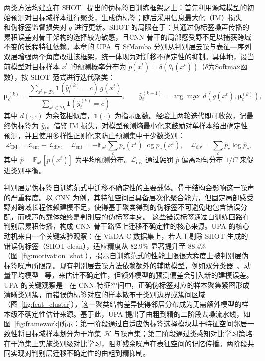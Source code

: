 两类方法均建立在 SHOT~\cite{liang2021source} 提出的伪标签自训练框架之上：首先利用源域模型的初始预测对目标域样本进行聚类，生成伪标签；随后采用信息最大化（IM）损失~\cite{gomes2010discriminative} 和伪标签监督损失对 $g$ 进行更新。SHOT 的局限在于：其通过伪标签噪声传播的累积误差对骨干架构的选择较为敏感，且CNN 骨干的局部感受野不足以捕获跨域不变的长程特征依赖。本章的 UPA 与 SfMamba 分别从判别层去噪与表征—序列双层增强两个角度改进该框架，统一体现为对迁移不确定性的抑制。具体地，设当前模型对目标样本 $x^t$ 的预测概率分布为 $p(x^t) = \delta(\theta_t(x^t))$（$\delta$为Softmax函数），按 SHOT 范式进行迭代聚类：
\begin{equation}
\boldsymbol{\mu}^{(k)}_c = \frac{\sum_{x^t \in \mathcal{D}_t} \mathbf{1}(\hat{y}^{(k)}_t = c) \, g(x^t)}{\sum_{x^t \in \mathcal{D}_t} \mathbf{1}(\hat{y}^{(k)}_t = c)}, \qquad
\hat{y}^{(k+1)}_t = \arg\max_c \, d\!\left(g(x^t), \boldsymbol{\mu}^{(k)}_c\right),
\label{eq:chap2_proto}
\end{equation}
其中 $d(\cdot, \cdot)$ 为余弦相似度，$\mathbf{1}(\cdot)$ 为指示函数。经验上两轮迭代即可收敛，记最终伪标签为 $\hat{y}_t$。借鉴 IM 损失，对模型预测熵最小化来鼓励对单样本给出确定性预测，并且使用多样性正则化来防止预测集中于少数类别：
\begin{equation}
\mathcal{L}_{\text{IM}} = \mathcal{L}_{\text{ent}} + \mathcal{L}_{\text{div}}, \quad
\mathcal{L}_{\text{ent}} = -\mathbb{E}_{x^t} \sum_c p_c(x^t) \log p_c(x^t), \quad
\mathcal{L}_{\text{div}} = \sum_c \hat{p}_c \log \hat{p}_c,
\label{eq:chap2_im}
\end{equation}
其中 $\hat{p} = \mathbb{E}_{x^t}[p(x^t)]$ 为平均预测分布。$\mathcal{L}_{\text{div}}$ 通过惩罚 $\hat{p}$ 偏离均匀分布 $1/C$ 来促进类别平衡。

判别层是伪标签自训练范式中迁移不确定性的主要载体。骨干结构会影响这一噪声的严重程度。以 CNN 为例，其特征空间虽具备层次化聚合能力，但固定局部感受野对跨域长程依赖建模不足，使得基于聚类得到的伪标签不可避免地包含错误分配，而噪声的载体始终是判别层的伪标签本身。
这些错误标签通过自训练回路在判别层累积传播，构成 CNN 骨干路径上迁移不确定性的核心来源。UPA 的核心动机来自一个关键实验观察：在 VisDA-C 数据集上，若人工剔除 SHOT 生成的错误伪标签（SHOT-clean），适应精度从 82.9\% 显著提升至 88.4\%（图~\ref{fig:motivation_shot}），揭示自训练范式的性能上限很大程度上被判别层伪标签噪声所限制。现有判别层去噪方法依赖额外的辅助模型，例如双分类器~\cite{liang2021source}、动量平均模型~\cite{tarvainen2017mean} 等，来估计不确定性，但额外模型的预测偏差会引入新的建模误差。UPA 的关键观察是：在 CNN 特征空间中，正确伪标签对应的样本聚集紧密形成清晰类别簇，而错误伪标签对应的样本散布于类别边界或簇间区域（图~\ref{fig:feat_cluster}），这一聚类结构差异使得邻居分布成为无需额外模型的样本级不确定性估计来源。基于此，UPA 提出了由粗到精的二阶段去噪流水线，如图~\ref{fig:framework}所示：第一阶段通过自适应伪标签选择模块基于特征空间邻居一致性将目标域样本划分为干净集 $\mathcal{H}$ 与噪声集；第二阶段通过类感知对比学习策略在干净集上实施类别级对比学习，阻断残余噪声在表征空间的记忆传播。两阶段共同实现对判别层迁移不确定性的由粗到精抑制。

